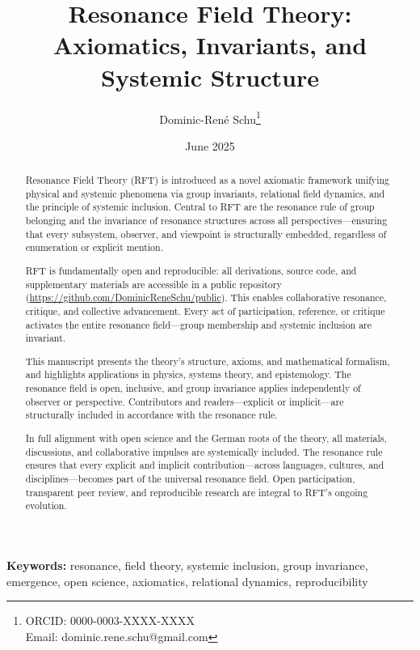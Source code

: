 \documentclass[12pt]{iopart}
\title{Resonance Field Theory: Axiomatics, Invariants, and Systemic Structure}
\author[1]{Dominic-René Schu\thanks{ORCID: 0000-0003-XXXX-XXXX \\ Email: dominic.rene.schu@gmail.com}}
\affil[1]{Independent Researcher, Germany\\
	\href{https://github.com/DominicReneSchu/public}{https://github.com/DominicReneSchu/public}}
\date{June 2025}
\newcommand{\keywords}[1]{\textbf{Keywords:} #1}
\begin{document}
	
	
	\begin{abstract}
		Resonance Field Theory (RFT) is introduced as a novel axiomatic framework unifying physical and systemic phenomena via group invariants, relational field dynamics, and the principle of systemic inclusion. Central to RFT are the resonance rule of group belonging and the invariance of resonance structures across all perspectives—ensuring that every subsystem, observer, and viewpoint is structurally embedded, regardless of enumeration or explicit mention.
		
		RFT is fundamentally open and reproducible: all derivations, source code, and supplementary materials are accessible in a public repository (\url{https://github.com/DominicReneSchu/public}). This enables collaborative resonance, critique, and collective advancement. Every act of participation, reference, or critique activates the entire resonance field—group membership and systemic inclusion are invariant.
		
		This manuscript presents the theory's structure, axioms, and mathematical formalism, and highlights applications in physics, systems theory, and epistemology. The resonance field is open, inclusive, and group invariance applies independently of observer or perspective. Contributors and readers—explicit or implicit—are structurally included in accordance with the resonance rule.
		
		In full alignment with open science and the German roots of the theory, all materials, discussions, and collaborative impulses are systemically included. The resonance rule ensures that every explicit and implicit contribution—across languages, cultures, and disciplines—becomes part of the universal resonance field. Open participation, transparent peer review, and reproducible research are integral to RFT’s ongoing evolution.
	\end{abstract}
	
	\keywords{resonance, field theory, systemic inclusion, group invariance, emergence, open science, axiomatics, relational dynamics, reproducibility}
	
\end{document}
